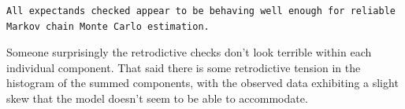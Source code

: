 \documentclass[
  letterpaper,
  DIV=11,
  numbers=noendperiod]{scrartcl}
\newenvironment{Shaded}{\begin{snugshade}}{\end{snugshade}}
\newcommand{\AttributeTok}[1]{\textcolor[rgb]{0.40,0.45,0.13}{#1}}
\newcommand{\ConstantTok}[1]{\textcolor[rgb]{0.56,0.35,0.01}{#1}}
\newcommand{\FunctionTok}[1]{\textcolor[rgb]{0.28,0.35,0.67}{#1}}
\newcommand{\NormalTok}[1]{\textcolor[rgb]{0.00,0.23,0.31}{#1}}
\newcommand{\OtherTok}[1]{\textcolor[rgb]{0.00,0.23,0.31}{#1}}
\newcommand{\SpecialCharTok}[1]{\textcolor[rgb]{0.37,0.37,0.37}{#1}}
\newcommand{\StringTok}[1]{\textcolor[rgb]{0.13,0.47,0.30}{#1}}
\begin{document}
\begin{Shaded}
\end{Shaded}

\begin{verbatim}
All expectands checked appear to be behaving well enough for reliable
Markov chain Monte Carlo estimation.
\end{verbatim}

Someone surprisingly the retrodictive checks don't look terrible within
each individual component. That said there is some retrodictive tension
in the histogram of the summed components, with the observed data
exhibiting a slight skew that the model doesn't seem to be able to
accommodate.
\end{document}
